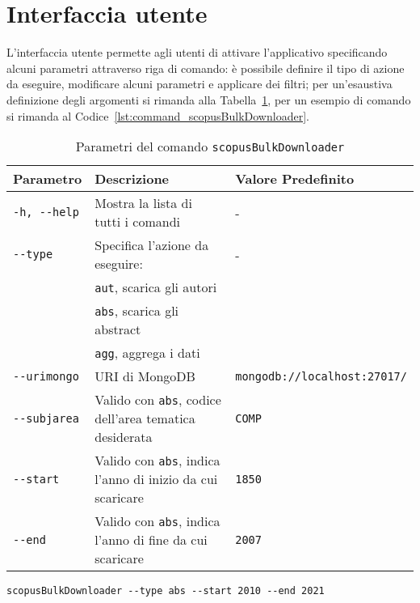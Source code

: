 \section{Interfaccia utente}
L'interfaccia utente permette agli utenti di attivare l'applicativo specificando alcuni parametri attraverso riga di comando: è possibile definire il tipo di azione da eseguire, modificare alcuni parametri e applicare dei filtri; per un'esaustiva definizione degli argomenti si rimanda alla Tabella~\ref{tab:parameters_scopusBulkDownloader}, per un esempio di comando si rimanda al Codice~\ref{lst:command_scopusBulkDownloader}.

\begin{table}[ht]
    \centering
    \begin{tabularx}{\textwidth}{|l|X|l|}
        \hline
        \textbf{Parametro} & \textbf{Descrizione} & \textbf{Valore Predefinito} \\
        \hline
        \texttt{-h, -{}-help} & Mostra la lista di tutti i comandi & - \\
        \hline
        \texttt{-{}-type} & Specifica l'azione da eseguire: & - \\
        & \texttt{aut}, scarica gli autori & \\
        & \texttt{abs}, scarica gli abstract & \\
        & \texttt{agg}, aggrega i dati & \\
        \hline
        \texttt{-{}-urimongo} & URI di MongoDB & \texttt{mongodb://localhost:27017/} \\
        \hline
        \texttt{-{}-subjarea} & Valido con \texttt{abs}, codice dell'area tematica desiderata & \texttt{COMP} \\
        \hline
        \texttt{-{}-start} & Valido con \texttt{abs}, indica l'anno di inizio da cui scaricare  & \texttt{1850} \\
        \hline
        \texttt{-{}-end} & Valido con \texttt{abs}, indica l'anno di fine da cui scaricare & \texttt{2007} \\
        \hline
    \end{tabularx}
    \caption{Parametri del comando \texttt{scopusBulkDownloader}}
    \label{tab:parameters_scopusBulkDownloader}
\end{table}

\begin{lstfloat}
    \begin{lstlisting}[basicstyle=\ttfamily, caption={Comando per scaricare gli abstract dal 2010 al 2021}, label={lst:command_scopusBulkDownloader}]
scopusBulkDownloader --type abs --start 2010 --end 2021
    \end{lstlisting}
\end{lstfloat}


